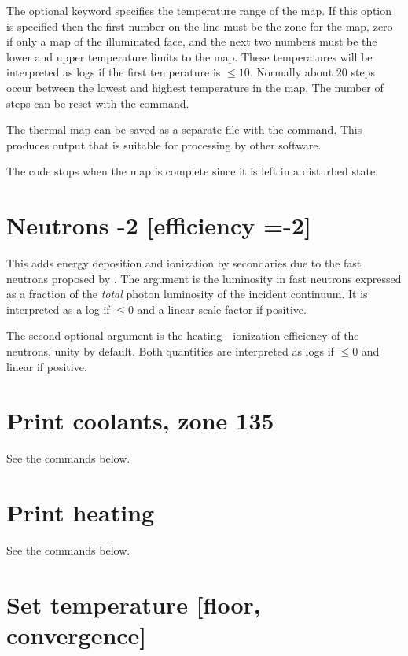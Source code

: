 The optional keyword  specifies the temperature
range of the map.
If this option is specified then the first number on the line must be the
zone for the map, zero if only a map of the illuminated face,
and the next two
numbers must be the lower and upper temperature limits to the map.
These temperatures
will be interpreted as logs if the first temperature is $\le 10$.  Normally
about 20 steps occur between the lowest and highest temperature in the map.
The number of steps can be reset with the  command.

The thermal map can be saved as a separate file with the
 command.
This produces output that is suitable for
processing by other software.

The code stops when the map is complete since it is left in a disturbed
state.

\section{Neutrons -2 [efficiency =-2]}

This adds energy deposition and ionization by secondaries due to the
fast neutrons proposed by \citet{Sikora1989}.
The argument
is the luminosity in fast neutrons expressed as a fraction of the
\emph{total} photon luminosity of the incident continuum.
It is interpreted as a log
if $\le 0$ and a linear scale factor if positive.

The second optional argument is the heating---ionization efficiency
of the neutrons, unity by default.
Both quantities are interpreted as logs
if $\le 0$ and linear if positive.

\section{Print coolants, zone 135}

See the  commands below.

\section{Print heating}

See the  commands below.

\section{Set temperature [floor, convergence]}

